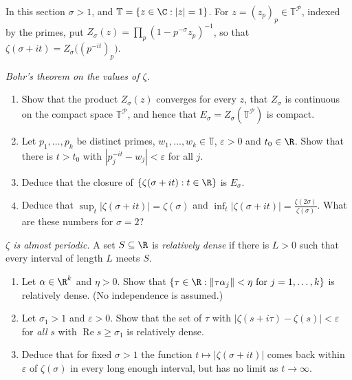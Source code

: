 In this section $\sigma>1$, and $\mathbb T=\{z\in\C:|z|=1\}$. For $z=(z_p)_p\in\mathbb T^{\mathcal P}$, indexed by the primes, put
$Z_\sigma(z)=\prod_p(1-p^{-\sigma}z_p)^{-1}$, so that $\zeta(\sigma+it)=Z_\sigma\bigl((p^{-it})_p\bigr)$.

\begin{exercise}[$\star\star$]\label{pb:bohrvalues}
\emph{Bohr's theorem on the values of $\zeta$.}
\begin{enumerate}[label=(\alph*)]
\item Show that the product $Z_\sigma(z)$ converges for every $z$, that $Z_\sigma$ is continuous on the compact space $\mathbb T^{\mathcal P}$, and hence that
$E_\sigma=Z_\sigma(\mathbb T^{\mathcal P})$ is compact.
\item Let $p_1,\dots,p_k$ be distinct primes, $w_1,\dots,w_k\in\mathbb T$, $\varepsilon>0$ and $t_0\in\R$. Show that there is $t>t_0$ with $|p_j^{-it}-w_j|<\varepsilon$
for all $j$.
\item Deduce that the closure of $\{\zeta(\sigma+it):t\in\R\}$ is $E_\sigma$.
\item Deduce that $\sup_t|\zeta(\sigma+it)|=\zeta(\sigma)$ and $\inf_t|\zeta(\sigma+it)|=\frac{\zeta(2\sigma)}{\zeta(\sigma)}$. What are these numbers for $\sigma=2$?
\end{enumerate}
\end{exercise}

\begin{exercise}[$\star\star$]\label{pb:almostperiodic}
\emph{$\zeta$ is almost periodic.} A set $S\subseteq\R$ is \emph{relatively dense} if there is $L>0$ such that every interval of length $L$ meets $S$.
\begin{enumerate}[label=(\alph*)]
\item Let $\alpha\in\R^k$ and $\eta>0$. Show that $\{\tau\in\R:\|\tau\alpha_j\|<\eta\text{ for }j=1,\dots,k\}$ is relatively dense. (No independence is assumed.)
\item Let $\sigma_1>1$ and $\varepsilon>0$. Show that the set of $\tau$ with $|\zeta(s+i\tau)-\zeta(s)|<\varepsilon$ for \emph{all} $s$ with $\operatorname{Re}s\ge\sigma_1$ is relatively
dense.
\item Deduce that for fixed $\sigma>1$ the function $t\mapsto|\zeta(\sigma+it)|$ comes back within $\varepsilon$ of $\zeta(\sigma)$ in every long enough interval, but has no
limit as $t\to\infty$.
\end{enumerate}
\end{exercise}

